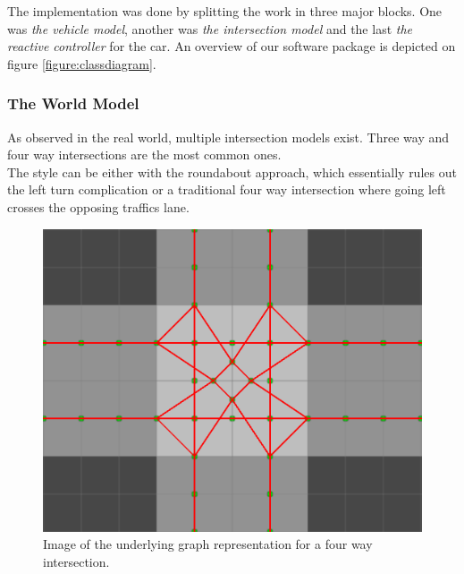 The implementation was done by splitting the work in three major blocks. One was \textit{the vehicle model}, another was \textit{the intersection model} and the last \textit{the reactive controller} for the car.
An overview of our software package is depicted on figure \ref{figure:classdiagram}.


\subsubsection{The World Model}
As observed in the real world, multiple intersection models exist. Three way and four way intersections are the most common ones.\\
The style can be either with the roundabout approach, which essentially rules out the left turn complication or a traditional four way intersection where going left crosses the opposing traffics lane.

\begin{figure}
\centering
\includegraphics[scale=.4]{img/graph.png}
\caption{Image of the underlying graph representation for a four way intersection.}
\label{figure:graph}
\end{figure}

